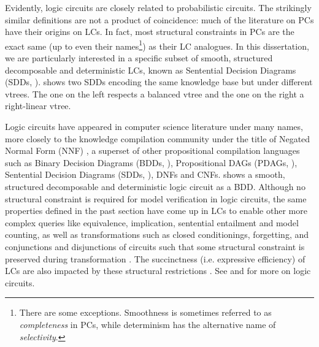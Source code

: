 Evidently, logic circuits are closely related to probabilistic circuits. The strikingly similar
definitions are not a product of coincidence: much of the literature on PCs have their origins on
LCs. In fact, most structural constraints in PCs are the exact same (up to even their
names\footnote{There are some exceptions. Smoothness is sometimes referred to as
\emph{completeness} in PCs, while determinism has the alternative name of \emph{selectivity}.})
as their LC analogues. In this dissertation, we are particularly interested in a specific
subset of smooth, structured decomposable and deterministic LCs, known as Sentential Decision
Diagrams (SDDs, \cite{darwiche11}).  shows two SDDs encoding the same knowledge
base but under different vtrees. The one on the left respects a balanced vtree and the one on the
right a right-linear vtree.

Logic circuits have appeared in computer science literature under many names, more closely to the
knowledge compilation community under the title of Negated Normal Form (NNF)
\citep{darwiche01b,darwiche99}, a superset of other propositional compilation languages such as
Binary Decision Diagrams (BDDs, \cite{bryant86}), Propositional DAGs (PDAGs, \cite{wachter06}),
Sentential Decision Diagrams (SDDs, \cite{darwiche11}), DNFs and CNFs.  shows a
smooth, structured decomposable and deterministic logic circuit as a BDD. Although no structural
constraint is required for model verification in logic circuits, the same properties defined in the
past section have come up in LCs to enable other more complex queries like equivalence,
implication, sentential entailment and model counting, as well as transformations such as closed
conditionings, forgetting, and conjunctions and disjunctions of circuits such that some structural
constraint is preserved during transformation \citep{darwiche02}. The succinctness (i.e. expressive
efficiency) of LCs are also impacted by these structural restrictions
\citep{gogic95,papadimitriou94,darwiche02}.  See \citet{darwiche02} and \citet{darwiche20} for more
on logic circuits.

